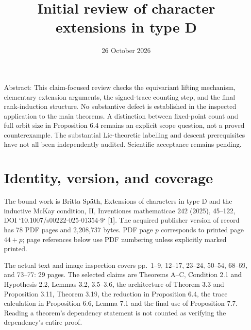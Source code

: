 \documentclass[10pt]{article}
\title{Initial review of character extensions in type D}
\author{}
\date{26 October 2026}
\begin{document}
\maketitle
Abstract: This claim-focused review checks the equivariant lifting mechanism, elementary extension arguments, the signed-trace counting step, and the final rank-induction structure. No substantive defect is established in the inspected application to the main theorems. A distinction between fixed-point count and full orbit size in Proposition 6.4 remains an explicit scope question, not a proved counterexample. The substantial Lie-theoretic labelling and descent prerequisites have not all been independently audited. Scientific acceptance remains pending.\par
\section*{Identity, version, and coverage}
The bound work is Britta Späth, Extensions of characters in type D and the inductive McKay condition, II, Inventiones mathematicae 242 (2025), 45–122, DOI `10.1007/s00222-025-01354-9` [1]. The acquired publisher version of record has 78 PDF pages and 2,208,737 bytes. PDF page \(p\) corresponds to printed page \(44+p\); page references below use PDF numbering unless explicitly marked printed.\par
The actual text and image inspection covers pp. 1–9, 12–17, 23–24, 50–54, 68–69, and 73–77: 29 pages. The selected claims are Theorems A–C, Condition 2.1 and Hypothesis 2.2, Lemmas 3.2, 3.5–3.6, the architecture of Theorem 3.3 and Proposition 3.11, Theorem 3.19, the reduction in Proposition 6.4, the trace calculation in Proposition 6.6, Lemma 7.1 and the final use of Proposition 7.7. Reading a theorem’s dependency statement is not counted as verifying the dependency’s entire proof.\par
\end{document}
